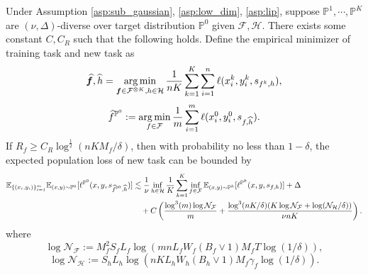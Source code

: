 \documentclass[11pt]{article}
\numberwithin{equation}{section}
\renewcommand{\P}{\mathbb{P}}
\begin{document}
\begin{thm}
\label{thm:generalization_all_diversity}
    Under Assumption \ref{asp:sub_gaussian}, \ref{asp:low_dim}, \ref{asp:lip}, suppose $\P^1,\cdots,\P^K$ are $(\nu,\Delta)$-diverse over target distribution $\P^0$ given $\mathcal{F},\mathcal{H}$.
    There exists some constant $C,C_R$ such that the following holds.
    Define the empirical minimizer of training task and new task as
    \begin{equation}
        \widehat{{\bm{f}}},\widehat{h}=\operatorname*{arg\,min}_{{\bm{f}}\in\mathcal{F}^{\otimes K},h\in\mathcal{H}} \frac{1}{nK}\sum_{k=1}^K\sum_{i=1}^n\ell(x_i^k,y_i^k,s_{f^k,h}),
    \end{equation}
    \begin{equation}
        \widehat{f}^{\P^0}:= \argmin_{f\in\mathcal{F}} \frac{1}{m}\sum_{i=1}^m \ell(x_i^0,y_i^0,s_{f,\widehat{h}}).
    \end{equation}
    If $R_f\geq C_R\log^{\frac{1}{2}}(nKM_f/\delta)$,
    then with probability no less than $1-\delta$, the expected population loss of new task can be bounded by
    \begin{equation}
        \begin{aligned}
            \E_{\{(x_i,y_i)\}_{i=1}^m} \E_{(x,y)\sim\P^0} [\ell^{\P^0}(x,y,s_{\widehat{f}^{\P^0},\widehat{h}})]
            &\lesssim \frac{1}{\nu}\inf_{h\in\mathcal{H}} \frac{1}{K}\sum_{k=1}^K \inf_{f\in\mathcal{F}}\E_{(x,y)\sim\P^k} [\ell^{\P^k} (x,y,s_{f,h})] + \Delta \\
            &\quad +C \left(\frac{\log^3(m)\log\mathcal{N}_\mathcal{F}}{m} + \frac{\log^3(nK/\delta)(K\log\mathcal{N}_\mathcal{F}+\log(\mathcal{N}_\mathcal{H}/\delta))}{\nu nK}\right).
        \end{aligned}
    \end{equation}
    where
    \begin{equation}
        \log\mathcal{N}_\mathcal{F}:=M_f^2S_fL_f\log\left(mnL_fW_f(B_f\vee 1)M_fT\log(1/\delta)\right),
    \end{equation}
    \begin{equation}
        \log\mathcal{N}_\mathcal{H}:=S_hL_h\log\left(nKL_hW_h(B_h\vee 1)M_f\gamma_f\log(1/\delta)\right).
    \end{equation}
\end{thm}
\end{document}
